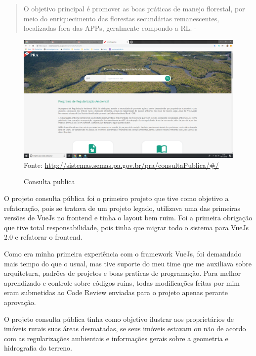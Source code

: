 \begin{quote}
    O objetivo principal é promover as boas
    práticas de manejo florestal, por meio do enriquecimento das florestas secundárias
    remanescentes, localizadas fora das APPs, geralmente compondo a RL. - \cite{de2015cadastro}
\end{quote}
\begin{figure}[H]
\centering
\caption{Consulta publica} %
\includegraphics[scale=0.22]{consulta-publica}\\  %
{\small Fonte: \url{http://sistemas.semas.pa.gov.br/pra/consultaPublica/#/}} %
\label{fig:exemplo} %
\end{figure}

O projeto consulta pública foi o primeiro projeto que tive como objetivo a refatoração, pois se tratava de um projeto legado, utilizava uma das primeiras versões de VueJs no frontend e tinha o layout bem ruim.
Foi a primeira obrigação que tive total responsabilidade, pois tinha que migrar todo o sistema para VueJs 2.0 e refatorar o frontend.

Como era minha primeira experiência com o framework VueJs, foi demandado mais tempo do que o usual, mas tive suporte do meu time que me auxiliava sobre arquitetura, padrões de projetos e boas praticas de programação.
Para melhor aprendizado e controle sobre códigos ruins, todas modificações feitas por mim eram submetidas ao Code Review enviadas para o projeto apenas perante aprovação. 

O projeto consulta pública tinha como objetivo ilustrar aos proprietários de imóveis rurais suas áreas desmatadas, se seus imóveis estavam ou não de acordo com as regularizações ambientais e informações gerais sobre a geometria e hidrografia do terreno.


